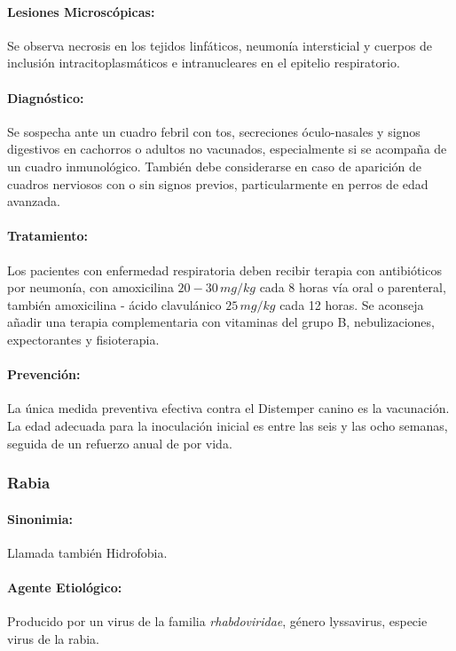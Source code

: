             \paragraph{Lesiones Microscópicas:} Se observa necrosis en los tejidos linfáticos, neumonía intersticial y cuerpos de inclusión intracitoplasmáticos e intranucleares en el epitelio respiratorio.

            \paragraph{Diagnóstico:} Se sospecha ante un cuadro febril con tos, secreciones óculo-nasales y signos digestivos en cachorros o adultos no vacunados, especialmente si se acompaña de un cuadro inmunológico. También debe considerarse en caso de aparición de cuadros nerviosos con o sin signos previos, particularmente en perros de edad avanzada. %

            \paragraph{Tratamiento:} Los pacientes con enfermedad respiratoria deben recibir terapia con antibióticos por neumonía, con amoxicilina $20-30\,mg/kg$ cada 8 horas vía oral o parenteral, también amoxicilina - ácido clavulánico $25\,mg/kg$ cada 12 horas. Se aconseja añadir una terapia complementaria con vitaminas del grupo B, nebulizaciones, expectorantes y fisioterapia. %

            \paragraph{Prevención:} La única medida preventiva efectiva contra el Distemper canino es la vacunación. La edad adecuada para la inoculación inicial es entre las seis y las ocho semanas, seguida de un refuerzo anual de por vida.

        \subsubsection{Rabia}

            \paragraph{Sinonimia:} Llamada también Hidrofobia.

            \paragraph{Agente Etiológico:} Producido por un virus de la familia \emph{rhabdoviridae}, género lyssavirus, especie virus de la rabia.

